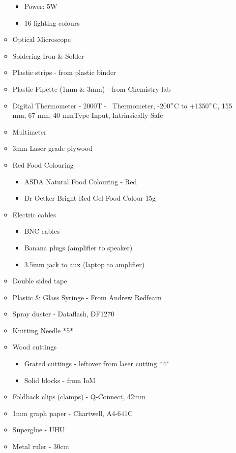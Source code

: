 \begin{enumerate}
\begin{itemize}
\begin{itemize}
\item Power: 5W
\item 16 lighting colours
\end{itemize}
\item Optical Microscope
\item Soldering Iron \& Solder
\item Plastic strips - from plastic binder
\item Plastic Pipette (1mm \& 3mm) - from Chemistry lab
\item Digital Thermometer - 2000T - \ Thermometer, -200$\degree$C to +1350$\degree$C, 155 mm, 67 mm, 40 mmType Input, Intrinsically Safe
\item Multimeter
\item 3mm Laser grade plywood
\item Red Food Colouring

\begin{itemize}
\item ASDA Natural Food Colouring - Red
\item Dr Oetker Bright Red Gel Food Colour 15g
\end{itemize}
\item Electric cables

\begin{itemize}
\item BNC cables
\item Banana plugs (amplifier to speaker)
\item 3.5mm jack to aux (laptop to amplifier)
\end{itemize}

\item Double sided tape
\item Plastic \& Glass Syringe - From Andrew Redfearn
\item Spray duster - Dataflash, DF1270
\item Knitting Needle *5*
\item Wood cuttings

\begin{itemize}
\item Grated cuttings - leftover from laser cutting *4*
\item Solid blocks - from IoM
\end{itemize}
\item Foldback clips (clamps) - Q-Connect, 42mm
\item 1mm graph paper - Chartwell, A4-641C
\item Superglue - UHU
\item Metal ruler - 30cm
\end{itemize}
\end{enumerate}

